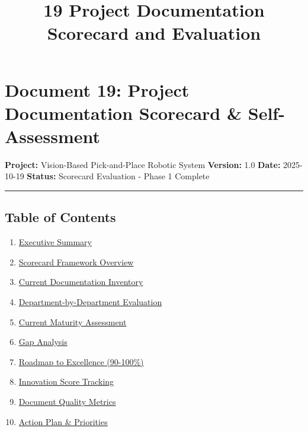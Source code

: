 \documentclass[
]{article}
\title{19 Project Documentation Scorecard and Evaluation}
\author{}
\date{}
\providecommand{\tightlist}{%
  \setlength{\itemsep}{0pt}\setlength{\parskip}{0pt}}
\begin{document}
\maketitle

{
\setcounter{tocdepth}{3}
\tableofcontents
}
\hypertarget{document-19-project-documentation-scorecard-self-assessment}{%
\section{Document 19: Project Documentation Scorecard \&
Self-Assessment}\label{document-19-project-documentation-scorecard-self-assessment}}

\textbf{Project:} Vision-Based Pick-and-Place Robotic System
\textbf{Version:} 1.0 \textbf{Date:} 2025-10-19 \textbf{Status:}
Scorecard Evaluation - Phase 1 Complete

\begin{center}\rule{0.5\linewidth}{0.5pt}\end{center}

\hypertarget{table-of-contents}{%
\subsection{Table of Contents}\label{table-of-contents}}

\begin{enumerate}
\def\labelenumi{\arabic{enumi}.}
\tightlist
\item
  \protect\hyperlink{1-executive-summary}{Executive Summary}
\item
  \protect\hyperlink{2-scorecard-framework-overview}{Scorecard Framework
  Overview}
\item
  \protect\hyperlink{3-current-documentation-inventory}{Current
  Documentation Inventory}
\item
  \protect\hyperlink{4-department-by-department-evaluation}{Department-by-Department
  Evaluation}
\item
  \protect\hyperlink{5-current-maturity-assessment}{Current Maturity
  Assessment}
\item
  \protect\hyperlink{6-gap-analysis}{Gap Analysis}
\item
  \protect\hyperlink{7-roadmap-to-excellence-90-100}{Roadmap to
  Excellence (90-100\%)}
\item
  \protect\hyperlink{8-innovation-score-tracking}{Innovation Score
  Tracking}
\item
  \protect\hyperlink{9-document-quality-metrics}{Document Quality
  Metrics}
\item
  \protect\hyperlink{10-action-plan--priorities}{Action Plan \&
  Priorities}
\end{enumerate}
\end{document}
